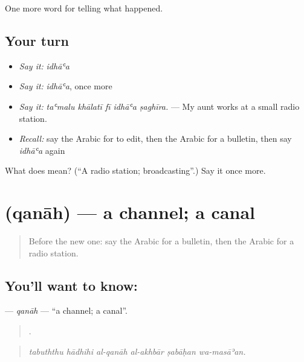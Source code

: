 \begin{grammarlens}[title={What you've built}]
One more word for telling what happened.
\end{grammarlens}

\subsection*{Your turn}
\begin{itemize}
\raggedright
  \item \emph{Say it:} \emph{idhāʿa}
  \item \emph{Say it:} \emph{idhāʿa}, once more
  \item \emph{Say it:} \emph{taʿmalu khālatī fī idhāʿa ṣaghīra.} — My aunt works at a small radio station.
  \item \emph{Recall:} say the Arabic for to edit, then the Arabic for a bulletin, then say \emph{idhāʿa} again
\end{itemize}

\begin{tcolorbox}[breakable,colback=teal!4,colframe=teal!35!black,title={Before you move on}]
What does  mean? (\textquotedblleft{}A radio station; broadcasting\textquotedblright{}.) Say it once more.
\end{tcolorbox}
\section[\texorpdfstring{\ar{قناة} (qanāh)}{قناة (qanāh)}]{ (qanāh) — a channel; a canal}

\label{lesson:AR-C297-qanah}



\begin{quote}
Before the new one: say the Arabic for a bulletin, then the Arabic for a radio station.
\end{quote}

\subsection*{You'll want to know: }
\textbf{} — \emph{qanāh} — \textquotedblleft{}a channel; a canal\textquotedblright{}.

\begin{quote}
     .
\end{quote}

\begin{quote}
\emph{tabuththu hādhihi al-qanāh al-akhbār ṣabāḥan wa-masāʾan.}
\end{quote}


